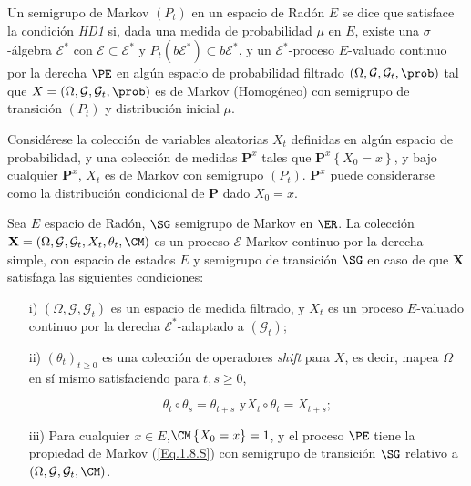 \begin{Def}[HD1]\label{Eq.2.1.S}
Un semigrupo de Markov $\left(P_{t}\right)$ en un espacio de
Rad\'on $E$ se dice que satisface la condici\'on {\em HD1} si,
dada una medida de probabilidad $\mu$ en $E$, existe una
$\sigma$-\'algebra $\mathcal{E^{*}}$ con
$\mathcal{E}\subset\mathcal{E}^{*}$ y
$P_{t}\left(b\mathcal{E}^{*}\right)\subset b\mathcal{E}^{*}$, y un
$\mathcal{E}^{*}$-proceso $E$-valuado continuo por la derecha
$\PE$ en alg\'un espacio de probabilidad filtrado
$\left(\Omega,\mathcal{G},\mathcal{G}_{t},\prob\right)$ tal que
$X=\left(\Omega,\mathcal{G},\mathcal{G}_{t},\prob\right)$ es de
Markov (Homog\'eneo) con semigrupo de transici\'on $(P_{t})$ y
distribuci\'on inicial $\mu$.
\end{Def}

Consid\'erese la colecci\'on de variables aleatorias $X_{t}$
definidas en alg\'un espacio de probabilidad, y una colecci\'on de
medidas $\mathbf{P}^{x}$ tales que
$\mathbf{P}^{x}\left\{X_{0}=x\right\}$, y bajo cualquier
$\mathbf{P}^{x}$, $X_{t}$ es de Markov con semigrupo
$\left(P_{t}\right)$. $\mathbf{P}^{x}$ puede considerarse como la
distribuci\'on condicional de $\mathbf{P}$ dado $X_{0}=x$.

\begin{Def}\label{Def.2.2.S}
Sea $E$ espacio de Rad\'on, $\SG$ semigrupo de Markov en $\ER$. La
colecci\'on
$\mathbf{X}=\left(\Omega,\mathcal{G},\mathcal{G}_{t},X_{t},\theta_{t},\CM\right)$
es un proceso $\mathcal{E}$-Markov continuo por la derecha simple,
con espacio de estados $E$ y semigrupo de transici\'on $\SG$ en
caso de que $\mathbf{X}$ satisfaga las siguientes condiciones:
\begin{itemize}
\item[i)] $\left(\Omega,\mathcal{G},\mathcal{G}_{t}\right)$ es un
espacio de medida filtrado, y $X_{t}$ es un proceso $E$-valuado
continuo por la derecha $\mathcal{E}^{*}$-adaptado a
$\left(\mathcal{G}_{t}\right)$;

\item[ii)] $\left(\theta_{t}\right)_{t\geq0}$ es una colecci\'on
de operadores {\em shift} para $X$, es decir, mapea $\Omega$ en
s\'i mismo satisfaciendo para $t,s\geq0$,

\begin{equation}\label{Eq.Shift}
\theta_{t}\circ\theta_{s}=\theta_{t+s}\textrm{ y
}X_{t}\circ\theta_{t}=X_{t+s};
\end{equation}

\item[iii)] Para cualquier $x\in E$,$\CM\left\{X_{0}=x\right\}=1$,
y el proceso $\PE$ tiene la propiedad de Markov (\ref{Eq.1.8.S})
con semigrupo de transici\'on $\SG$ relativo a
$\left(\Omega,\mathcal{G},\mathcal{G}_{t},\CM\right)$.
\end{itemize}
\end{Def}

